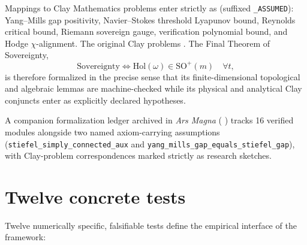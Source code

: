 \documentclass{alienfolio}
\begin{document}
Mappings to Clay Mathematics problems enter strictly as
 (suffixed \texttt{\_ASSUMED}):
Yang--Mills gap positivity, Navier--Stokes threshold Lyapunov bound,
Reynolds critical bound, Riemann sovereign gauge, verification
polynomial bound, and Hodge $\chi$-alignment. The original Clay problems
. The Final Theorem of Sovereignty,
\begin{equation}
\mathrm{Sovereignty} \iff \mathrm{Hol}(\omega) \in
\mathrm{SO}^{+}(m)\quad \forall t,
\end{equation}
is therefore formalized in the precise sense that its finite-dimensional
topological and algebraic lemmas are machine-checked while its physical
and analytical Clay conjuncts enter as explicitly declared hypotheses.

A companion formalization ledger archived in \emph{Ars Magna}
( \cite{arsmagna}) tracks 16 verified
modules alongside two named axiom-carrying assumptions
(\texttt{stiefel\_\allowbreak simply\_\allowbreak connected\_\allowbreak aux}
and
\texttt{yang\_\allowbreak mills\_\allowbreak gap\_\allowbreak equals\_\allowbreak stiefel\_\allowbreak gap}),
with Clay-problem correspondences marked strictly as research sketches.

\section{Twelve concrete tests}
\label{sec:tests}

Twelve numerically specific, falsifiable tests define the empirical
interface of the framework:
\end{document}
